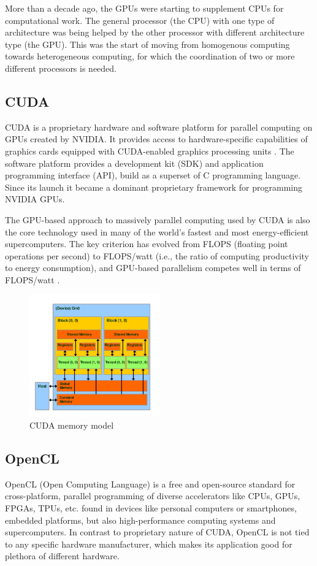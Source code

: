 More than a decade ago, the GPUs were starting to supplement CPUs for computational work. The general processor (the CPU) with one type of architecture was being helped by the other processor with different architecture type (the GPU). This was the start of moving from homogenous computing towards heterogeneous computing, for which the coordination of two or more different processors is needed. 

\subsection{CUDA}
CUDA is a proprietary hardware and software platform for parallel computing on GPUs created by NVIDIA. It provides access to hardware-specific capabilities of graphics cards equipped with CUDA-enabled graphics processing units \cite{stortiCUDAEngineersIntroduction2016}. The software platform provides a development kit (SDK) and application programming interface (API), build as a superset of C programming language. Since its launch it became a dominant proprietary framework for programming NVIDIA GPUs.

The GPU-based approach to massively parallel computing used by CUDA is also the core technology used in many of the world’s fastest and most energy-efficient supercomputers. The key criterion has evolved from FLOPS (floating point operations per second) to FLOPS/watt (i.e., the ratio of computing productivity to energy consumption), and GPU-based parallelism competes well in terms of FLOPS/watt \citep{stortiCUDAEngineersIntroduction2016}.

\begin{figure}[!ht]
	\centering
	\includegraphics[width=0.5\textwidth]{figures/cuda-device-memory.jpg}
	\caption{CUDA memory model}
	\label{fig:cuda-memory-model}
\end{figure}

\subsection{OpenCL}
OpenCL (Open Computing Language) is a free and open-source standard for cross-platform, parallel programming of diverse accelerators like CPUs, GPUs, FPGAs, TPUs, etc. found in devices like personal computers or smartphones, embedded platforms, but also high-performance computing systems and supercomputers. In contrast to proprietary nature of CUDA, OpenCL is not tied to any specific hardware manufacturer, which makes its application good for plethora of different hardware.

